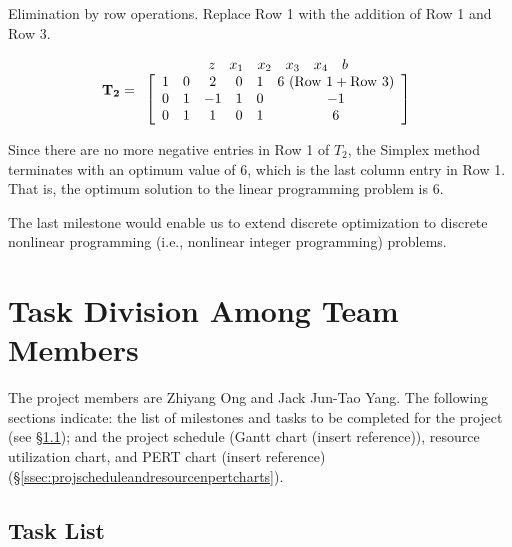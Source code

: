 \documentclass[letter,12pt]{article}
\begin{document}
Elimination by row operations. Replace Row 1 with the addition of Row 1 and Row 3.

\begin{equation*}
\mathbf{T_{2}} =  
\begin{array}{c}
	\begin{array}{cccccc}
	z & x_{1} & x_{2} & x_{3} & x_{4} & b \\
	\end{array}
	\\
	\left[ \begin{array}{cccccc}
	1 & 0 & 2 & 0 & 1 & 6\ {\rm (Row\ 1 + Row\ 3)} \\
	0 & 1 & -1 & 1 & 0 & -1  \\
	0 & 1 & 1 & 0 & 1 & 6
	\end{array} \right]
\end{array}
\end{equation*}

Since there are no more negative entries in Row 1 of $T_{2}$, the Simplex method terminates with an optimum value of 6, which is the last column entry in Row 1. \\

That is, the optimum solution to the linear programming problem is 6.



The last milestone would enable us to extend discrete optimization to discrete nonlinear programming (i.e., nonlinear integer programming) problems.





\section{Task Division Among Team Members}
\label{sec:taskdiv}

The project members are Zhiyang Ong and Jack Jun-Tao Yang. The following sections indicate: the list of milestones and tasks to be completed for the project (see \S\ref{ssec:tasklist}); and the project schedule (Gantt chart (insert reference)), resource utilization chart, and PERT chart (insert reference) (\S\ref{ssec:projscheduleandresourcenpertcharts}).






\subsection{Task List}
\label{ssec:tasklist}
\end{document}
